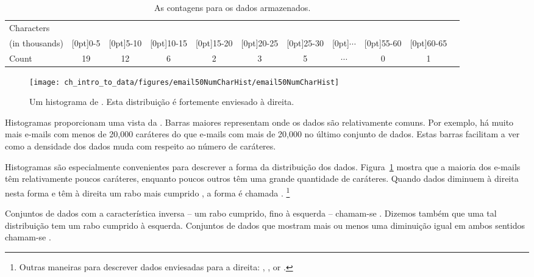\begin{table}[ht]
\centering\small
\begin{tabular}{l ccc ccc ccc c}
  \hline
Characters & \\
(in thousands) & \raisebox{1.5ex}[0pt]{0-5} & \raisebox{1.5ex}[0pt]{5-10} & \raisebox{1.5ex}[0pt]{10-15} & \raisebox{1.5ex}[0pt]{15-20} & \raisebox{1.5ex}[0pt]{20-25} & \raisebox{1.5ex}[0pt]{25-30} & \raisebox{1.5ex}[0pt]{$\cdots$} & \raisebox{1.5ex}[0pt]{55-60} & \raisebox{1.5ex}[0pt]{60-65} \\
  \hline
Count & 19 & 12 & 6 & 2 & 3 & 5 & $\cdots$ & 0 & 1 \\
  \hline
\end{tabular}
\caption{As contagens para os dados  armazenados.}
\label{binnedNumCharTable}
\end{table}

\begin{figure}[bth]
   \centering
   \texttt{[image: ch\_intro\_to\_data/figures/email50NumCharHist/email50NumCharHist]}
   \caption{Um histograma de . Esta distribuição é fortemente enviesado à direita.}
   \label{email50NumCharHist}
\end{figure}

Histogramas proporcionam uma vista da .
Barras maiores representam onde os dados são relativamente comuns.
Por exemplo, há muito mais e-mails com menos de 20,000 caráteres do que e-mails com mais de 20,000 no último conjunto de dados.
Estas barras facilitam a ver como a densidade dos dados muda com respeito ao número de caráteres.

Histogramas são especialmente convenientes para descrever a forma da distribuição dos dados\label{shapeFirstDiscussed}.
Figura~\ref{email50NumCharHist} mostra que a maioria dos e-mails têm relativamente poucos caráteres, enquanto poucos outros têm uma grande quantidade de caráteres.
Quando dados diminuem à direita nesta forma e têm à direita um rabo mais cumprido , a forma é chamada .
\footnote{Outras maneiras para descrever dados enviesadas para a direita:
, , or .}

Conjuntos de dados com a característica inversa -- um rabo cumprido, fino à esquerda -- chamam-se .
Dizemos também que uma tal distribuição tem um rabo cumprido à esquerda.
Conjuntos de dados que mostram mais ou menos uma diminuição igual em ambos sentidos chamam-se .

